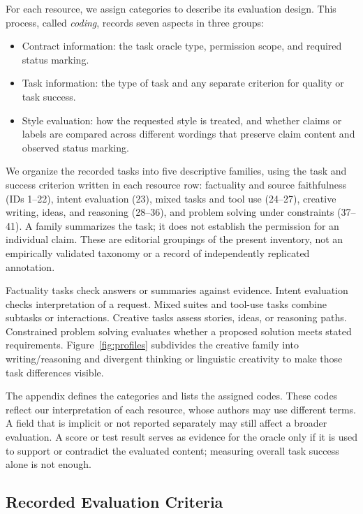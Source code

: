 \documentclass{clv2025}
\begin{document}
For each resource, we assign categories to describe its evaluation design.
This process, called \emph{coding}, records seven aspects in three groups:
\begin{itemize}
\item Contract information: the task oracle type, permission scope, and required
status marking.
\item Task information: the type of task and any separate criterion for
quality or task success.
\item Style evaluation: how the requested style is treated, and whether
claims or labels are compared across different wordings that preserve claim
content and observed status marking.
\end{itemize}
We organize the recorded tasks into five descriptive families, using the
task and success criterion written in each resource row: factuality and
source faithfulness (IDs 1--22), intent evaluation (23), mixed tasks and
tool use (24--27), creative writing, ideas, and reasoning (28--36), and
problem solving under constraints (37--41). A family summarizes the task;
it does not establish the permission for an individual claim. These are
editorial groupings of the present inventory, not an empirically validated
taxonomy or a record of independently replicated annotation.

Factuality tasks check answers or summaries against evidence. Intent
evaluation checks interpretation of a request. Mixed suites and tool-use
tasks combine subtasks or interactions. Creative tasks assess stories,
ideas, or reasoning paths. Constrained problem solving evaluates whether
a proposed solution meets stated requirements. Figure~\ref{fig:profiles}
subdivides the creative family into writing/reasoning and divergent thinking
or linguistic creativity to make those task differences visible.

The appendix defines the categories and lists the assigned codes. These
codes reflect our interpretation of each resource, whose authors may use
different terms. A field that is implicit or not reported separately may
still affect a broader evaluation. A score or test result serves as evidence
for the oracle only if it is used to support or contradict the evaluated
content; measuring overall task success alone is not enough.

\subsection{Recorded Evaluation Criteria}\label{sec:mapping}
\end{document}
